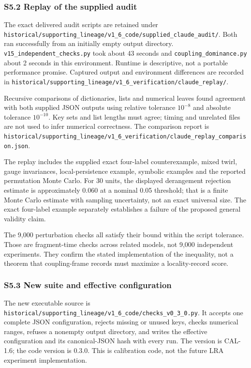\documentclass[
  10pt,
  a4paper,
]{article}
\begin{document}
\subsubsection{S5.2 Replay of the supplied
audit}\label{s5.2-replay-of-the-supplied-audit}

The exact delivered audit scripts are retained under
\nolinkurl{historical/supporting_lineage/v1_6_code/supplied_claude_audit/}.
Both ran successfully from an initially empty output directory.
\nolinkurl{v15_independent_checks.py} took about 43 seconds and
\nolinkurl{coupling_dominance.py} about 2 seconds in this environment.
Runtime is descriptive, not a portable performance promise. Captured
output and environment differences are recorded in
\nolinkurl{historical/supporting_lineage/v1_6_verification/claude_replay/}.

Recursive comparisons of dictionaries, lists and numerical leaves found
agreement with both supplied JSON outputs using relative tolerance
\(10^{-8}\) and absolute tolerance \(10^{-10}\). Key sets and list
lengths must agree; timing and unrelated files are not used to infer
numerical correctness. The comparison report is
\nolinkurl{historical/supporting_lineage/v1_6_verification/claude_replay_comparison.json}.

The replay includes the supplied exact four-label counterexample, mixed
twirl, gauge invariances, local-persistence example, symbolic examples
and the reported permutation Monte Carlo. For 30 units, the displayed
derangement rejection estimate is approximately 0.060 at a nominal 0.05
threshold; that is a finite Monte Carlo estimate with sampling
uncertainty, not an exact universal size. The exact four-label example
separately establishes a failure of the proposed general validity claim.

The 9,000 perturbation checks all satisfy their bound within the script
tolerance. Those are fragment-time checks across related models, not
9,000 independent experiments. They confirm the stated implementation of
the inequality, not a theorem that coupling-frame records must maximize
a locality-record score.

\subsubsection{S5.3 New suite and effective
configuration}\label{s5.3-new-suite-and-effective-configuration}

The new executable source is
\nolinkurl{historical/supporting_lineage/v1_6_code/checks_v0_3_0.py}. It
accepts one complete JSON configuration, rejects missing or unused keys,
checks numerical ranges, refuses a nonempty output directory, and writes
the effective configuration and its canonical-JSON hash with every run.
The version is CAL-1.6; the code version is 0.3.0. This is calibration
code, not the future LRA experiment implementation.
\end{document}

